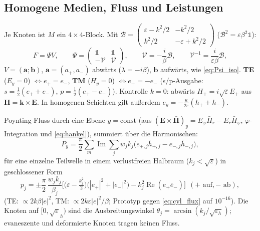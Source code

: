 \subsection{Homogene Medien, Fluss und Leistungen}
Je Knoten ist $M$ ein $4\times4$-Block. Mit $\mathcal B=\begin{pmatrix}\varepsilon-k^2/2&-k^2/2\\k^2/2&-\varepsilon+k^2/2\end{pmatrix}$
($\mathcal B^2=\varepsilon\beta^2\mathbb 1$):
\begin{equation}
  F=\Psi V,\qquad\Psi=\begin{pmatrix}\mathbb 1&\mathbb 1\\-\mathcal V&\mathcal V\end{pmatrix},\qquad
  \mathcal V=-\frac{i}{\beta}\mathcal B,\qquad\mathcal V^{-1}=\frac{i}{\varepsilon\beta}\mathcal B,
  \label{eq:cyl_Psi}
\end{equation}
$V=(\mathbf a;\mathbf b)$, $\mathbf a=(a_+,a_-)$ abwärts ($\lambda=-i\beta$), $\mathbf b$ aufwärts, wie \eqref{eq:Psi_iso}.
\textbf{TE} ($E_y=0$) $\Leftrightarrow e_+=e_-$, \textbf{TM} ($H_y=0$) $\Leftrightarrow e_+=-e_-$ (s/p-Ausgabe:
$s=\tfrac12(e_++e_-)$, $p=\tfrac12(e_+-e_-)$). Kontrolle $k=0$: abwärts $H_+=i\sqrt\varepsilon E_+$ aus
$\mathbf H=\mathbf k\times\mathbf E$. In homogenen Schichten gilt außerdem $e_y=-\frac{\kappa}{2\varepsilon}(h_++h_-)$.

Poynting-Fluss durch eine Ebene $y=\text{const}$ (aus $(\mathbf E\times\bar{\mathbf H})_y=E_\varphi\bar H_r-E_r\bar H_\varphi$,
$\varphi$-Integration und \eqref{eq:hankel}), summiert über die Harmonischen:
\begin{equation}
  P_y=\frac\pi2\sum_m\operatorname{Im}\sum_jw_jk_j\big(e_{+,j}\bar h_{+,j}-e_{-,j}\bar h_{-,j}\big),
  \label{eq:cyl_flux}
\end{equation}
für eine einzelne Teilwelle in einem verlustfreien Halbraum ($k_j<\sqrt\varepsilon$) in geschlossener Form
\begin{equation}
  p_j=\pm\frac\pi2\,\frac{w_jk_j}{\beta_j}\Big[\big(\varepsilon-\tfrac{k_j^2}2\big)\big(|e_+|^2+|e_-|^2\big)-k_j^2\operatorname{Re}(e_+\bar e_-)\Big]
  \ \ (+\text{ auf}, -\text{ ab}),
  \label{eq:cyl_flux_closed}
\end{equation}
(TE: $\propto2k\beta|e|^2$, TM: $\propto2k\varepsilon|e|^2/\beta$; Prototyp gegen \eqref{eq:cyl_flux} auf $10^{-16}$).
Die Knoten auf $[0,\sqrt\varepsilon_h)$ sind die Ausbreitungswinkel $\theta_j=\arcsin(k_j/\sqrt{\varepsilon_h})$;
evaneszente und deformierte Knoten tragen keinen Fluss.

